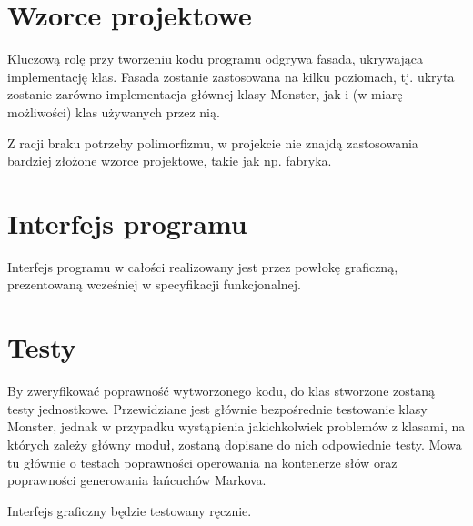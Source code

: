 \documentclass{article}
\begin{document}
\section{Wzorce projektowe}

Kluczową rolę przy tworzeniu kodu programu odgrywa fasada, ukrywająca implementację klas.
Fasada zostanie zastosowana na kilku poziomach, tj. ukryta zostanie zarówno implementacja
głównej klasy Monster, jak i (w miarę możliwości) klas używanych przez nią.

Z racji braku potrzeby polimorfizmu, w projekcie nie znajdą zastosowania bardziej
złożone wzorce projektowe, takie jak np. fabryka.


\section{Interfejs programu}

Interfejs programu w całości realizowany jest przez powłokę graficzną, prezentowaną
wcześniej w specyfikacji funkcjonalnej.


\section{Testy}

By zweryfikować poprawność wytworzonego kodu, do klas stworzone zostaną testy jednostkowe.
Przewidziane jest głównie bezpośrednie testowanie klasy Monster, jednak w przypadku
wystąpienia jakichkolwiek problemów z klasami, na których zależy główny moduł, zostaną
dopisane do nich odpowiednie testy. Mowa tu głównie o testach poprawności operowania na
kontenerze słów oraz poprawności generowania łańcuchów Markova.

Interfejs graficzny będzie testowany ręcznie.
\end{document}
